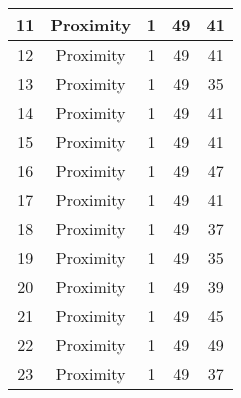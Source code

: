 \documentclass[results.tex]{subfiles}
\begin{document}
\begin{center}
\begin{tabular}{| c || c | c | c | c |}
            \hline
            11                      & Proximity                    & 1                      & 49                      & 41                   \\
            \hline
            12                      & Proximity                    & 1                      & 49                      & 41                   \\
            \hline
            13                      & Proximity                    & 1                      & 49                      & 35                   \\
            \hline
            14                      & Proximity                    & 1                      & 49                      & 41                   \\
            \hline
            15                      & Proximity                    & 1                      & 49                      & 41                   \\
            \hline
            16                      & Proximity                    & 1                      & 49                      & 47                   \\
            \hline
            17                      & Proximity                    & 1                      & 49                      & 41                   \\
            \hline
            18                      & Proximity                    & 1                      & 49                      & 37                   \\
            \hline
            19                      & Proximity                    & 1                      & 49                      & 35                   \\
            \hline
            20                      & Proximity                    & 1                      & 49                      & 39                   \\
            \hline
            21                      & Proximity                    & 1                      & 49                      & 45                   \\
            \hline
            22                      & Proximity                    & 1                      & 49                      & 49                   \\
            \hline
            23                      & Proximity                    & 1                      & 49                      & 37                   \\

\end{tabular}
\end{center}
\end{document}
